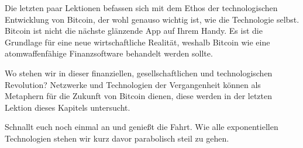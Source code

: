 Die letzten paar Lektionen befassen sich mit dem Ethos der technologischen
Entwicklung von Bitcoin, der wohl genauso wichtig ist, wie die Technologie
selbst. Bitcoin ist nicht die nächste glänzende App auf Ihrem Handy. Es ist die
Grundlage für eine neue wirtschaftliche Realität, weshalb Bitcoin wie eine
atomwaffenfähige Finanzsoftware behandelt werden sollte.

Wo stehen wir in dieser finanziellen, gesellschaftlichen und technologischen
Revolution? Netzwerke und Technologien der Vergangenheit können als Metaphern
für die Zukunft von Bitcoin dienen, diese werden in der letzten Lektion dieses
Kapitels untersucht.

Schnallt euch noch einmal an und genießt die Fahrt. Wie alle exponentiellen
Technologien stehen wir kurz davor parabolisch steil zu gehen.
